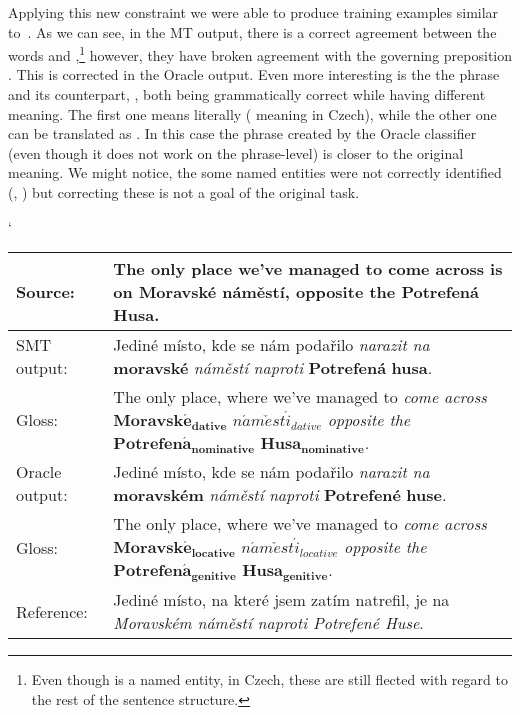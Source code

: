 Applying this new constraint we were able to produce training examples similar to~.
As we can see, in the MT output, there is a correct agreement between the words  and ,\footnote{
Even though  is a named entity, in Czech, these are still flected with regard to the rest of the sentence
structure.} however, they have broken agreement with the governing preposition . This is corrected in the Oracle output.
Even more interesting is the the phrase  and its counterpart, ,
both being grammatically correct while having different meaning. The first one means literally 
( meaning  in Czech), while the other one can be translated as .
In this case the phrase created by the Oracle classifier (even though it does not work on the phrase-level) is closer
to the original meaning. We might notice, the some named entities were not correctly identified (, ) but
correcting these is not a goal of the original task.

\begin{myexample}
    \small
    \catcode`
    \begin{center}
    \begin{tabular}{|l|p{}|}
    \hline
    \textbf{Source:}  &  \textbf{The only place we've managed to come across is on Moravské náměstí, opposite the Potrefená Husa.}  \\
    \hline
    SMT output:  &  Jediné místo, kde se nám podařilo \textit{narazit na} \textbf{moravské} \textit{náměstí} \textit{naproti} \textbf{Potrefená} \textbf{husa}.  \\
    \hline
    Gloss:  &  The only place, where we've managed to \textit{come across} $\mathbf{Moravsk\acute{e}_{dative}}$ $\mathit{n\acute{a}m\check{e}st\acute{i}_{dative}}$ \textit{opposite the} $\mathbf{Potrefen\acute{a}_{nominative}}$ $\mathbf{Husa_{nominative}}$. \\
    \hline
    Oracle output:  &  Jediné místo, kde se nám podařilo \textit{narazit na} \textbf{moravském} \textit{náměstí} \textit{naproti} \textbf{Potrefené} \textbf{huse}.  \\
    \hline
    Gloss:  &  The only place, where we've managed to \textit{come across} $\mathbf{Moravsk\acute{e}_{locative}}$ $\mathit{n\acute{a}m\check{e}st\acute{i}_{locative}}$ \textit{opposite the} $\mathbf{Potrefen\acute{a}_{genitive}}$ $\mathbf{Husa_{genitive}}$.  \\
    \hline
    Reference:  &  Jediné místo, na které jsem zatím natrefil, je na \textit{Moravském náměstí naproti Potrefené Huse}.  \\
    \hline
    \end{tabular}
    \label{ex-oracle-parentmark}
    \end{center}
\end{myexample}

